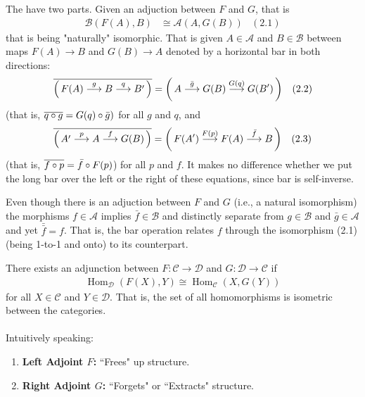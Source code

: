 \documentclass[12pt,a4paper]{report}
\newcommand{\CAT}[1]{\mathscr{#1}}
\newcommand{\MORPHISM}[1]{\overset{#1}\longrightarrow}
\begin{document}
\begin{definition}

The  have two parts.  Given an adjuction between $F$ and $G$, that is 
\begin{align*}
	\CAT{B}(F(A),B) &\cong \CAT{A}(A, G(B)) &(2.1)
\end{align*}that is being "naturally" isomorphic.  That is given $A \in \CAT{A}$ and $B\in \CAT{B}$ between maps $F(A) \to B$ and $G(B) \to A$ denoted by a horizontal bar in both directions:
\begin{align*}
	\CONJ{\PAREN{F(A)\MORPHISM{g}B\MORPHISM{q}B'}} &= \PAREN{A\MORPHISM{\bar{g}}G(B)\MORPHISM{G(q)}G(B')} & (2.2)
\end{align*}(that is, $\overline{q\circ g}=G(q)\circ \bar{g})$ for all $g$ and $q$, and 
\begin{align*}
	\CONJ{\PAREN{A'\MORPHISM{p}A\MORPHISM{f}G(B)}} &= \PAREN{F(A')\MORPHISM{F(p)}F(A)\MORPHISM{\bar{f}}B} & (2.3)
\end{align*}(that is, $\overline{f\circ p} = \bar{f}\circ F(p)$) for all $p$ and $f$.  It makes no difference whether we put the long bar over the left or the right of these equations, since bar is self-inverse.
\end{definition}
\HLINE
\begin{remark}Even though there is an adjuction between $F$ and $G$ (i.e., a natural isomorphism) the morphisms $f\in \CAT{A}$ implies $\bar{f}\in \CAT{B}$ and distinctly separate from $g \in \CAT{B}$ and $\bar{g}\in \CAT{A}$ and yet $\bar{\bar{f}}=f$.  That is, the bar operation relates $f$ through the isomorphism (2.1) (being 1-to-1 and onto) to its counterpart.
\end{remark}
\HLINE
\begin{remark}

There exists an adjunction between $F : \CAT{C} \to \CAT{D}$ and $G:\CAT{D}\to \CAT{C}$ if
\begin{align*}
	\operatorname{Hom}_\CAT{D}(F(X), Y) \cong \operatorname{Hom}_\CAT{C}(X, G(Y))
\end{align*}for all $X \in \CAT{C}$ and $	Y \in \CAT{D}$.  That is, the set of all homomorphisms is isometric between the categories.\\
\\
Intuitively speaking:
\begin{enumerate}
	\item \textbf{Left Adjoint $F$: } ``Frees" up structure.
	\item \textbf{Right Adjoint $G$: } ``Forgets" or ``Extracts" structure.
\end{enumerate}

\end{remark}
\end{document}
